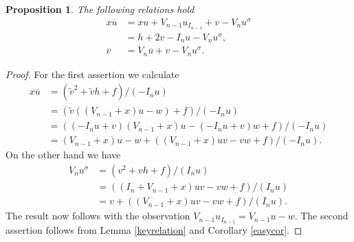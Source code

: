 \documentclass[10pt,a4paper]{amsart}
\newtheorem{proposition}{Proposition}
\begin{document}
\begin{proposition}
\label{cyclictime}
The following relations hold
\begin{align*}
x \overline u &= x u +V_{n-1} u_{I_{n-1}} + v - V_n u^\sigma \\
			&= h +2v - I_n u  - V_n u^\sigma, \\
\overline v &= V_n \overline u + v - V_n u^\sigma.
\end{align*}
\end{proposition}

\begin{proof}
For the first assertion we calculate 
\begin{align*} x \overline u &= (\tilde v ^2 + \tilde v h +f)/(-I_n u) \\
&= (\tilde v ((V_{n-1}+x) u - w) + f) / (-I_n u) \\
&= ((-I_n u + v) (V_{n-1}+x) u - (-I_n u +v) w + f)/(-I_n u) \\
&= (V_{n-1}+x) u - w + ((V_{n-1}+x) u v - vw + f)/(-I_n u).
\end{align*}
On the other hand we have \begin{align*}
V_n u^\sigma &= (v^2 + vh +f)/(I_nu) \\
&=  ((I_n+V_{n-1}+x)uv-vw +f) / (I_n u) \\
&= v + ((V_{n-1}+x)uv-vw+f)/(I_n u).
\end{align*}
The result now follows with the observation $V_{n-1}u_{I_{n-1}} = V_{n-1}u-w$.
The second assertion follows from Lemma \ref{keyrelation} and Corollary \ref{easycor}.
\end{proof}
\end{document}
